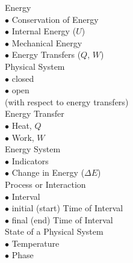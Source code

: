 \vspace*{-\parskip}
\noindent
\parbox[c]{\leftcolumn}{
	\noindent
	Energy
		\\\hspace*{1em}$\bullet$ Conservation of Energy
		\\\hspace*{1em}$\bullet$ Internal Energy ($U$)
		\\\hspace*{1em}$\bullet$ Mechanical Energy
		\\\hspace*{1em}$\bullet$ Energy Transfers ($Q$, $W$)\\

	\noindent
	Physical System
		\\\hspace*{1em}$\bullet$ closed
		\\\hspace*{1em}$\bullet$ open\\
	(with respect to energy transfers)\\

	\noindent
	Energy Transfer
		\\\hspace*{1em}$\bullet$ Heat, $Q$
		\\\hspace*{1em}$\bullet$ Work, $W$\\
	
	\noindent
	Energy System
		\\\hspace*{1em}$\bullet$ Indicators
		\\\hspace*{1em}$\bullet$ Change in Energy ($\Delta E$)\\
			
	\noindent
	Process or Interaction
		\\\hspace*{1em}$\bullet$ Interval
		\\\hspace*{1em}$\bullet$ initial (start) Time of Interval
		\\\hspace*{1em}$\bullet$ final (end) Time of Interval\\
	
	\noindent
	State of a Physical System
		\\\hspace*{1em}$\bullet$ Temperature
		\\\hspace*{1em}$\bullet$ Phase\\
	
}
